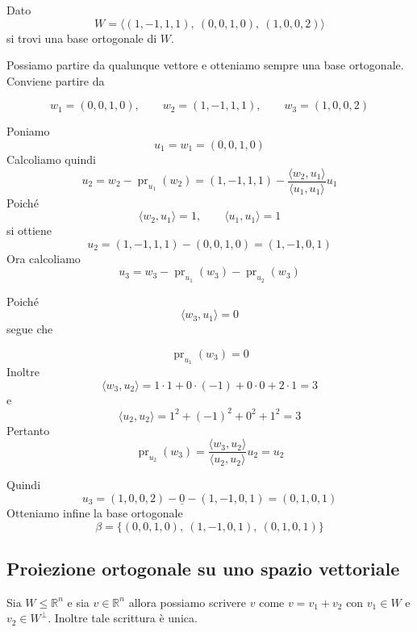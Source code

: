 \documentclass[
  a4paper,
]{article}
\begin{document}
\begin{examplebox}
Dato \[
W=\langle (1,-1,1,1),\ (0,0,1,0),\ (1,0,0,2)\rangle
\] si trovi una base ortogonale di \(W\).

Possiamo partire da qualunque vettore e otteniamo sempre una base
ortogonale. Conviene partire da

\[
w_1=(0,0,1,0),
\qquad
w_2=(1,-1,1,1),
\qquad
w_3=(1,0,0,2)
\]

Poniamo \[
u_1=w_1=(0,0,1,0)
\] Calcoliamo quindi \[
u_2
=
w_2-\operatorname{pr}_{u_1}(w_2)
=
(1,-1,1,1)
-
\frac{\langle w_2,u_1\rangle}{\langle u_1,u_1\rangle}u_1
\] Poiché \[
\langle w_2,u_1\rangle = 1,
\qquad
\langle u_1,u_1\rangle = 1
\] si ottiene \[
u_2
=
(1,-1,1,1)-(0,0,1,0)
=
(1,-1,0,1)
\] Ora calcoliamo \[
u_3
=
w_3
-\operatorname{pr}_{u_1}(w_3)
-\operatorname{pr}_{u_2}(w_3)
\]

Poiché \[
\langle w_3,u_1\rangle = 0
\] segue che

\[
\operatorname{pr}_{u_1}(w_3)=0
\] Inoltre \[
\langle w_3,u_2\rangle
=
1\cdot 1+0\cdot(-1)+0\cdot 0+2\cdot 1
=
3
\] e \[
\langle u_2,u_2\rangle
=
1^2+(-1)^2+0^2+1^2
=
3
\] Pertanto \[
\operatorname{pr}_{u_2}(w_3)
=
\frac{\langle w_3,u_2\rangle}{\langle u_2,u_2\rangle}u_2
=
u_2
\]

Quindi \[
u_3
=
(1,0,0,2)- \underline{0} -(1,-1,0,1)
=
(0,1,0,1)
\] Otteniamo infine la base ortogonale \[
\beta
=
\bigl\{
(0,0,1,0),
\ (1,-1,0,1),
\ (0,1,0,1)
\bigr\}
\]
\end{examplebox}

\hypertarget{proiezione-ortogonale-su-uno-spazio-vettoriale}{%
\subsection{Proiezione ortogonale su uno spazio
vettoriale}\label{proiezione-ortogonale-su-uno-spazio-vettoriale}}

\begin{propositionbox}
Sia \(W \leq \mathbb{R}^n\) e sia \(v \in \mathbb{R}^n\) allora possiamo
scrivere \(v\) come \(v = v_1 + v_2\) con \(v_1 \in W\) e
\(v_2 \in W^{\perp}\). Inoltre tale scrittura è unica.
\end{propositionbox}
\end{document}
